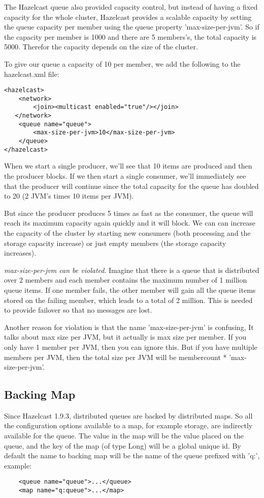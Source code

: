 The Hazelcast queue also provided capacity control, but instead of having a fixed capacity for the whole cluster, Hazelcast provides a scalable capacity by setting the queue capacity per member using the queue property 'max-size-per-jvm'. So if the capacity per member is 1000 and there are 5 members's, the total capacity is 5000. Therefor the capacity depends on the size of the cluster.

To give our queue a capacity of 10 per member, we add the following to the hazelcast.xml file:
\begin{lstlisting}
<hazelcast>
    <network>
        <join><multicast enabled="true"/></join>
   </network>
    <queue name="queue">
        <max-size-per-jvm>10</max-size-per-jvm>
    </queue>
</hazelcast>
\end{lstlisting}
When we start a single producer, we'll see that 10 items are produced and then the producer blocks. If we then start a single consumer, we'll immediately see that the producer will continue since the total capacity for the queue has doubled to 20 (2 JVM's times 10 items per JVM). 

But since the producer produces 5 times as fast as the consumer, the queue will reach its maximum capacity again quickly and it will block. We can can increase the capacity of the cluster by starting new consumers (both processing and the storage capacity increase) or just empty members (the storage capacity increases).

\emph{max-size-per-jvm can be violated}. Imagine that there is a queue that is distributed over 2 members and each member contains the maximum number of 1 million queue items. If one member fails, the other member will gain all the queue items stored on the failing member, which leads to a total of 2 million. This is needed to provide failover so that no messages are lost. 

Another reason for violation is that the name 'max-size-per-jvm' is confusing, It talks about max size per JVM, but it actually is max size per member. If you only have 1 member per JVM, then you can ignore this. But if you have multiple members per JVM, then the total size per JVM will be membercount * 'max-size-per-jvm'.

\subsection{Backing Map}
Since Hazelcast 1.9.3, distributed queues are backed by distributed maps. So all the configuration options available to a map, for example storage, are indirectly available for the queue. The value in the map will be the value placed on the queue, and the key of the map (of type Long) will be a global unique id. By default the name to backing map will be the name of the queue prefixed with 'q:', example:
\begin{lstlisting}
    <queue name="queue">...</queue>
    <map name="q:queue">...</map>
\end{lstlisting}

